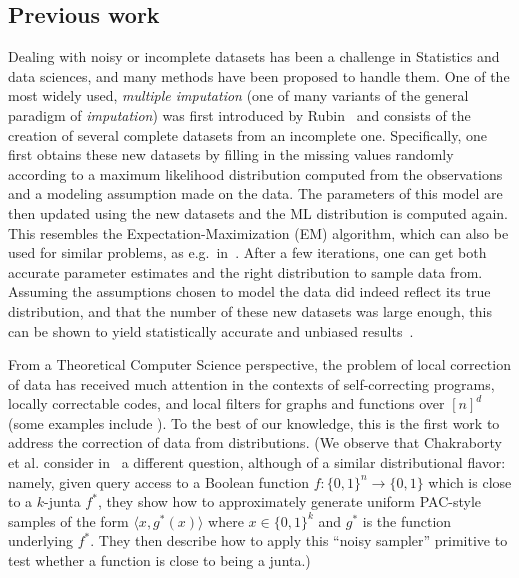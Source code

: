 \subsection{Previous work}
Dealing with noisy or incomplete datasets has been a challenge in Statistics and data sciences, and many methods 
have been proposed to handle them. One of the most widely used, \emph{multiple imputation} (one of many variants of the 
general paradigm of \emph{imputation}) was first introduced by Rubin~\cite{Rubin:87} and consists of the creation of several complete datasets from an incomplete one. 
Specifically, one first obtains these new datasets by filling in the missing values randomly according to a maximum likelihood distribution computed from the observations and a modeling assumption made on the data. The parameters of this model are then updated using the new datasets and the ML distribution is computed again. This resembles the Expectation-Maximization (EM) algorithm, which can also be used for similar problems, as e.g.~in~\cite{DLR77}. After a few iterations, one can get both accurate parameter estimates and the right distribution to sample data from. Assuming the assumptions chosen to model 
the data did indeed reflect its true 
 distribution, and that the number of these new datasets was large enough, this can be shown to yield statistically accurate and unbiased 
 results~\cite{book:incomplete:data,book:imputation}.

From a Theoretical Computer Science perspective, the problem of local correction of data
has received much attention in the contexts
of self-correcting programs, locally correctable codes, and
local filters for graphs and functions over $[n]^d$ 
(some examples include 
\cite{BLR:90,book:yekhanin:ldc,ACCL:08,SS:10,BGJRW:12,JR:11}). 
To {the best of} our knowledge, this is the first work to address the
correction of data from distributions. (We observe that Chakraborty et al. consider in~\cite{CGM:11} a different question, although of 
a similar distributional flavor: namely, given query access to a Boolean function $f\colon\{0,1\}^n\to\{0,1\}$ which is close to a $k$-junta $f^\ast$, they show how 
to approximately generate uniform PAC-style samples of the form $\langle x,g^\ast(x)\rangle$ where $x\in\{0,1\}^k$ and $g^\ast$ is the function underlying $f^\ast$. They then describe how to apply this ``noisy sampler'' primitive to test whether a function is close to being a junta.)

